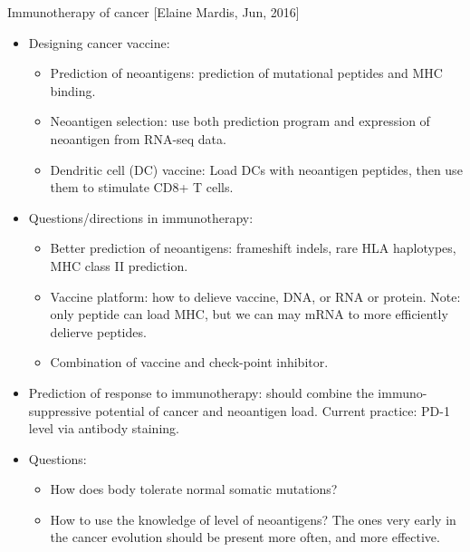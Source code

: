 \documentclass{report}
\begin{document}
Immunotherapy of cancer [Elaine Mardis, Jun, 2016]
\begin{itemize}
	\item Designing cancer vaccine: 
	\begin{itemize}
		\item Prediction of neoantigens: prediction of mutational peptides and MHC binding. 
		\item Neoantigen selection: use both prediction program and expression of neoantigen from RNA-seq data. 
		\item Dendritic cell (DC) vaccine: Load DCs with neoantigen peptides, then use them to stimulate CD8+ T cells. 
	\end{itemize} 
	
	\item Questions/directions in immunotherapy: 
	\begin{itemize}
		\item Better prediction of neoantigens: frameshift indels, rare HLA haplotypes, MHC class II prediction. 
		\item Vaccine platform: how to delieve vaccine, DNA, or RNA or protein. Note: only peptide can load MHC, but we can may mRNA to more efficiently delierve peptides. 
		\item Combination of vaccine and check-point inhibitor. 
	\end{itemize}
	
	\item Prediction of response to immunotherapy: should combine the immuno-suppressive potential of cancer and neoantigen load. Current practice: PD-1 level via antibody staining.  
	
	\item Questions: 
	\begin{itemize}
		\item How does body tolerate normal somatic mutations? 
		\item How to use the knowledge of level of neoantigens? The ones very early in the cancer evolution should be present more often, and more effective. 
	\end{itemize}
\end{itemize}
\end{document}

